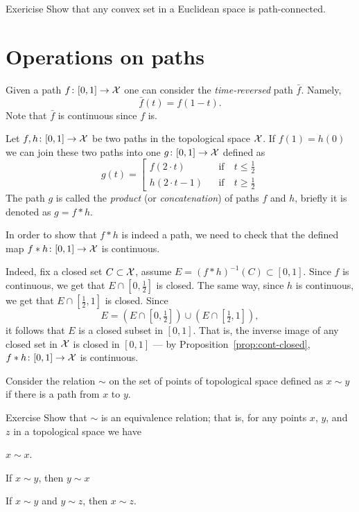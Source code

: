 \begin{thm}{Exericise}
Show that any convex set in a Euclidean space is path-connected. 
\end{thm}

\section{Operations on paths}\label{sec:Operations on paths}

Given a path $f\colon[0,1]\to \mathcal{X}$ one can consider the \emph{time-reversed} path $\bar f$.
Namely, 
\[\bar f(t)=f(1-t).\]
Note that $\bar f$ is continuous since $f$ is.

Let $f,h\colon[0,1]\to \mathcal{X}$ be two paths in the topological space $\mathcal{X}$.
If $f(1)=h(0)$ we can join these two paths into one $g\colon[0,1]\to \mathcal{X}$ defined as 
\[g(t)=
\left[
\begin{aligned}
f(2\cdot t)&&\text{if}&\ t\le \tfrac12
\\
h(2\cdot t-1)&&\text{if}&\ t\ge \tfrac12
\end{aligned}
\right.
\]
The path $g$ is called the \emph{product} (or \emph{concatenation}) of paths $f$ and $h$, briefly it is denoted as $g=f * h$.

In order to show that $f * h$ is indeed a path, we need to check that the defined map $f * h\colon[0,1]\to \mathcal{X}$ is continuous.

Indeed, fix a closed set $C\subset \mathcal{X}$,
assume $E=(f * h)^{-1}(C)\subset [0,1]$.
Since $f$ is continuous, we get that $E\cap [0,\tfrac12]$ is closed.
The same way, since $h$ is continuous, we get that $E\cap [\tfrac12,1]$ is closed.
Since 
\[E=(E\cap [0,\tfrac12])\cup (E\cap [\tfrac12,1]),\] 
it follows that $E$ is a closed subset in $[0,1]$.
That is, the inverse image of any closed set in $\mathcal{X}$ is closed in $[0,1]$ --- by Proposition~\ref{prop:cont-closed}, $f * h\colon[0,1]\to \mathcal{X}$ is continuous.


Consider the relation $\sim$ on the set of points of topological space defined as $x\sim y$ if there is a path from $x$ to $y$.

\begin{thm}{Exercise}
Show that $\sim$ is an equivalence relation;
that is, for any points $x$, $y$, and $z$ in a topological space we have

\begin{subthm}{}
$x\sim x$.
\end{subthm}

\begin{subthm}{}
If $x\sim y$, then $y\sim x$
\end{subthm}

\begin{subthm}{}
If $x\sim y$ and $y\sim z$, then $x\sim z$.
\end{subthm}

\end{thm}

